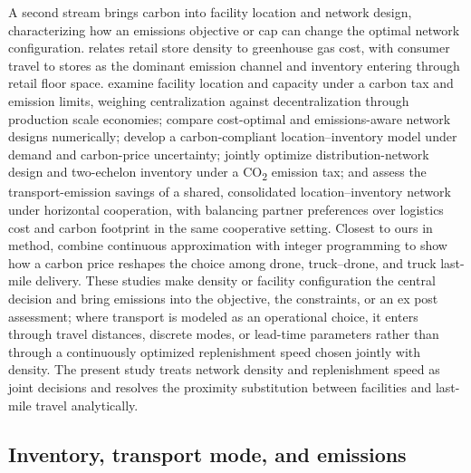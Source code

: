 \documentclass[11pt]{article}
\theoremstyle{definition}
\theoremstyle{remark}
\theoremstyle{plain}
\begin{document}
A second stream brings carbon into facility location and network design, characterizing how an emissions
objective or cap can change the optimal network configuration. \citet{cachon2014retail}
relates retail store density to greenhouse gas cost, with consumer travel to stores as the dominant emission
channel and inventory entering through retail floor space. \citet{turken2017facility} examine facility location
and capacity under a carbon tax and emission limits, weighing centralization against decentralization through
production scale economies; \citet{harris2011assessing} compare cost-optimal and emissions-aware network
designs numerically; \citet{wang2020carbon} develop a carbon-compliant location--inventory model under
demand and carbon-price uncertainty; \citet{li2017joint} jointly optimize distribution-network design and
two-echelon inventory under a CO\textsubscript{2} emission tax; and \citet{hacardiaux2020assessing} assess the
transport-emission savings of a shared, consolidated location--inventory network under horizontal cooperation,
with \citet{hacardiaux2022balancing} balancing partner preferences over logistics cost and carbon footprint
in the same cooperative setting. Closest to ours in method, \citet{zhang2026economic} combine continuous
approximation with integer programming to show how a carbon price reshapes the choice among drone,
truck--drone, and truck last-mile delivery.
These studies make density or facility configuration the central decision and bring emissions into the
objective, the constraints, or an ex post assessment; where transport is modeled as an operational choice, it
enters through travel distances, discrete modes, or lead-time parameters rather than through a continuously
optimized replenishment speed chosen jointly with density.
The present study treats network density and replenishment speed as joint decisions and resolves the proximity
substitution between facilities and last-mile travel analytically.

\subsection{Inventory, transport mode, and emissions}
\end{document}
